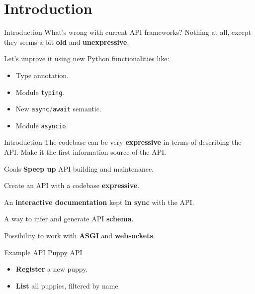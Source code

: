 \section{Introduction}
\begin{frame}{Introduction}
    What's wrong with current API frameworks? Nothing at all, except they seems a bit \textbf{old} and \textbf{unexpressive}.

    Let's improve it using new Python functionalities like:
    
    \begin{itemize}
        \item Type annotation.
        \item Module \texttt{typing}. 
        \item New \texttt{async}/\texttt{await} semantic.
        \item Module \texttt{asyncio}.
    \end{itemize}
\end{frame}

\begin{frame}{Introduction}
    The codebase can be very \textbf{expressive} in terms of describing the API. Make it the first information source of the API.
\end{frame}

\begin{frame}{Goals}
    \textbf{Speep up} API building and maintenance.

    Create an API with a codebase \textbf{expressive}.

    An \textbf{interactive documentation} kept \textbf{in sync} with the API.

    A way to infer and generate API \textbf{schema}.

    Possibility to work with \textbf{ASGI} and \textbf{websockets}.
\end{frame}

\begin{frame}{Example API}
    Puppy API \faPaw

    \begin{itemize}
        \item \textbf{Register} a new puppy.
        \item \textbf{List} all puppies, filtered by name.
    \end{itemize}
\end{frame}

